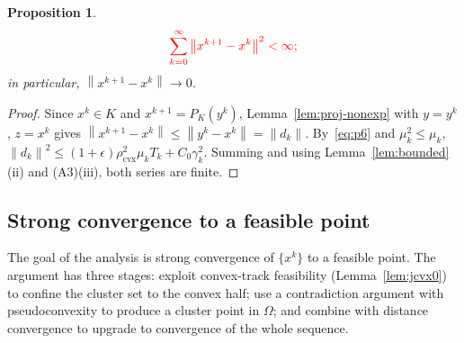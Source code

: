 \documentclass[]{interact}
\theoremstyle{plain}
\newtheorem{proposition}[theorem]{Proposition}
\theoremstyle{definition}
\theoremstyle{remark}
\newcommand{\norm}[1]{\left\lVert #1 \right\rVert}
\newcommand{\cvx}{\mathrm{cvx}}
\begin{document}
\begin{proposition}\label{prop:regularity}
\[\textcolor{red}{
\sum_{k=0}^{\infty}\norm{x^{k+1}-x^k}^{2}<\infty;
}\]
in particular,
$\norm{x^{k+1}-x^k}\to0$.
\end{proposition}
\begin{proof}
Since $x^k\in K$ and $x^{k+1}=P_K(y^k)$, Lemma~\ref{lem:proj-nonexp} with $y=y^k$, $z=x^k$
gives $\norm{x^{k+1}-x^k}\le\norm{y^k-x^k}=\norm{d_k}$. By~\eqref{eq:p6} and
$\mu_k^2\le\mu_k$, $\norm{d_k}^2\le(1+\epsilon)\rho_{\cvx}^2\mu_k T_k+C_0\gamma_k^2$.
Summing and using Lemma~\ref{lem:bounded}(ii) and (A3)(iii), both series are finite.
\end{proof}

\subsection{Strong convergence to a feasible point}\label{ssec:strong}
The goal of the analysis is strong convergence of $\{x^k\}$ to a feasible point. The
argument has three stages: exploit convex-track feasibility (Lemma~\ref{lem:jcvx0}) to
confine the cluster set to the convex half; use a contradiction argument with
pseudoconvexity to produce a cluster point in $\Omega$; and combine with distance
convergence to upgrade to convergence of the whole sequence.
\end{document}

